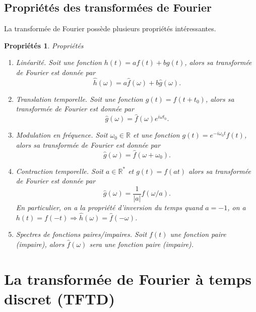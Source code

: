 \documentclass[a4paper,12pt]{book}
\newcommand{\real}{\mathbb{R}}
\newcommand{\fh}{\hat{f}}
\newcommand{\gh}{\hat{g}}
\newcommand{\hh}{\hat{h}}
\newtheorem{proprietes}{Propriétés}
\begin{document}
\subsection{Propriétés des transformées de Fourier}

La transformée de Fourier possède plusieurs propriétés intéressantes. 
\begin{proprietes}{Propriétés}
 \begin{enumerate}
  \item Linéarité. Soit une fonction $h(t)=af(t)+bg(t)$, alors sa transformée de Fourier est donnée par
  \begin{equation}
   \hh(\omega)=a\fh(\omega)+b\gh(\omega).
  \end{equation}
  \item Translation temporelle. Soit une fonction $g(t)=f(t+t_0)$, alors sa transformée de Fourier est donnée par
  \begin{equation}
   \gh(\omega)=\fh(\omega)e^{i\omega t_0}.
  \end{equation}
  \item Modulation en fréquence. Soit $\omega_0\in\real$ et une fonction $g(t)=e^{-i\omega_0 t}f(t)$, alors sa transformée
  de Fourier est donnée par
  \begin{equation}
   \gh(\omega)=\fh(\omega+\omega_0).
  \end{equation}
  \item Contraction temporelle. Soit $a\in\real^\ast$ et $g(t)=f(at)$ alors sa transformée de Fourier est donnée par
  \begin{equation}
   \gh(\omega)=\frac{1}{|a|}\fh(\omega/a).
  \end{equation}
  En particulier, on a la propriété d'inversion du temps quand $a=-1$, on a $h(t)=f(-t)\Rightarrow\hh(\omega)=\fh(-\omega)$.
  \item Spectres de fonctions paires/impaires. Soit $f(t)$ une fonction paire (impaire), alors $\fh(\omega)$ sera une fonction paire (impaire).
 \end{enumerate}

\end{proprietes}

\section{La transformée de Fourier à temps discret (TFTD)}
\end{document}
